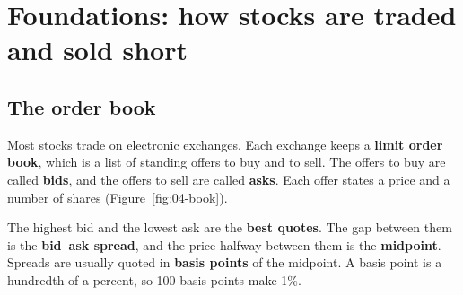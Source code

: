 \section{Foundations: how stocks are traded and sold short}
\label{sec:04-foundations}

\subsection{The order book}

Most stocks trade on electronic exchanges. Each exchange keeps a \textbf{limit order book}, which is a list of standing offers to buy and to sell. The offers to buy are called \textbf{bids}, and the offers to sell are called \textbf{asks}. Each offer states a price and a number of shares (Figure~\ref{fig:04-book}).

The highest bid and the lowest ask are the \textbf{best quotes}. The gap between them is the \textbf{bid--ask spread}, and the price halfway between them is the \textbf{midpoint}. Spreads are usually quoted in \textbf{basis points} of the midpoint. A basis point is a hundredth of a percent, so 100 basis points make 1\%.

